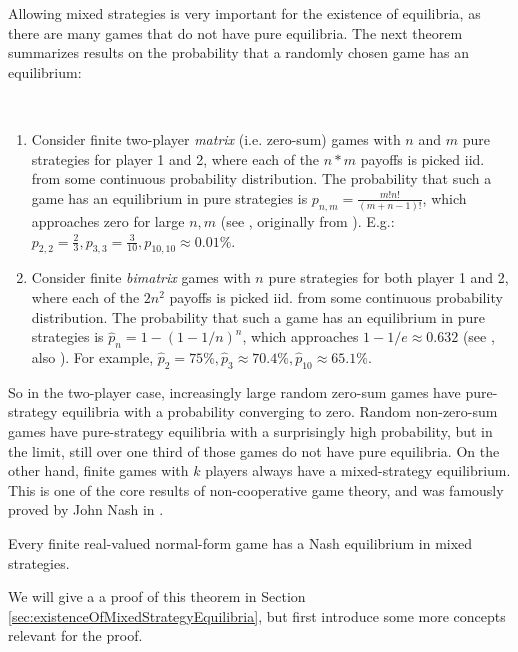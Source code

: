 \documentclass[a4paper]{scrreprt}
\begin{document}
    Allowing mixed strategies is very important for the existence of equilibria, as there are many games that do not have pure equilibria. The next theorem summarizes results on the probability that a randomly chosen game has an equilibrium:
    \begin{thm}~
        \begin{enumerate}
            \item
            Consider finite two-player \emph{matrix} (i.e. zero-sum) games with $n$ and $m$ pure strategies for player 1 and 2, where each of the $n*m$ payoffs is picked iid. from some continuous probability distribution.
            The probability that such a game has an equilibrium in pure strategies is $p_{n, m} = \frac{m! n!}{(m+n-1)!}$, which approaches zero for large $n, m$ (see \cite[p.15]{bib:matsumotoGameTheory}, originally from \cite{bib:goldbergProbabilityOfEquilibria}).
            E.g.: $p_{2, 2} = \frac{2}{3}, p_{3, 3}=\frac{3}{10}, p_{10, 10} \approx 0.01\%$.
            
            \item 
            Consider finite \emph{bimatrix} games with $n$ pure strategies for both player 1 and 2, where each of the $2n^2$ payoffs is picked iid. from some continuous probability distribution.
            The probability that such a game has an equilibrium in pure strategies is $\hat{p}_{n} = 1 - (1-1/n)^n$, which approaches $1 - 1/e \approx 0.632$
            (see \cite{bib:goldbergProbabilityOfEquilibria}, also \cite[Exercise 1.2]{bib:nisanAlgorithmicGameTheoryCh1Basic}).
            For example, $\hat{p}_{2} = 75\%, \hat{p}_{3} \approx 70.4\%, \hat{p}_{10} \approx 65.1\%$.
        \end{enumerate}
    \end{thm}
    So in the two-player case, increasingly large random zero-sum games have pure-strategy equilibria with a probability converging to zero. Random non-zero-sum games have pure-strategy equilibria with a surprisingly high probability, but in the limit, still over one third of those games do not have pure equilibria.
    On the other hand, finite games with $k$ players always have a mixed-strategy equilibrium. This is one of the core results of non-cooperative game theory, and was famously proved by John Nash in \cite{bib:nashOnePageProofOfEquilibria}.
    
    \begin{thm}
        Every finite real-valued normal-form game has a Nash equilibrium in mixed strategies.
        \label{thm:existenceOfMixedStrategyEquilibria}
    \end{thm}
    We will give a a proof of this theorem in Section \ref{sec:existenceOfMixedStrategyEquilibria}, but first introduce some more concepts relevant for the proof.
    
\end{document}
